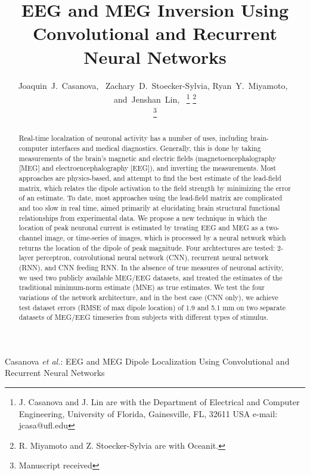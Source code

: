 \documentclass[journal]{IEEEtran}
\begin{document}

\title{EEG and MEG Inversion Using Convolutional and Recurrent Neural Networks}


\author{Joaquin~J.~Casanova,~
        Zachary~D.~Stoecker-Sylvia,
        Ryan~Y.~Miyamoto,~
        and~Jenshan~Lin,~%
\thanks{J. Casanova and J. Lin are with the Department
of Electrical and Computer Engineering, University of Florida, Gainesville,
FL, 32611 USA e-mail: jcasa@ufl.edu}%
\thanks{R. Miyamoto and Z. Stoecker-Sylvia are with Oceanit.}%

\thanks{Manuscript received }}

%
{Casanova \MakeLowercase{\textit{et al.}}: EEG and MEG Dipole Localization Using Convolutional and Recurrent Neural Networks}
\maketitle

\begin{abstract}

  Real-time localzation of neuronal activity has a number of uses, including brain-computer interfaces and medical diagnostics. Generally, this is done by taking measurements of the brain's magnetic and electric fields (magnetoencephalography [MEG] and electroencephalography [EEG]), and inverting the measurements. Most approaches are physics-based, and attempt to find the best estimate of the lead-field matrix, which relates the dipole activation to the field strength by minimizing the error of an estimate. To date, most approaches using the lead-field matrix are complicated and too slow in real time, aimed primarily at elucidating brain structural functional relationships from experimental data. We propose a new technique in which the location of peak neuronal current is estimated by treating EEG and MEG as a two-channel image, or time-series of images, which is processed by a neural network which returns the location of the dipole of peak magnitude. Four archtectures are tested: 2-layer perceptron, convolutional neural network (CNN), recurrent neural network (RNN), and CNN feeding RNN. In the absence of true measures of neuronal activity, we used two publicly available MEG/EEG datasets, and treated the estimates of the traditional minimum-norm estimate (MNE) as true estimates. We test the four variations of the network architecture, and in the best case (CNN only), we achieve test dataset errors (RMSE of max dipole location) of 1.9 and 5.1 mm on two separate datasets of MEG/EEG timeseries from subjects with different types of stimulus.
  
\end{abstract}
\end{document}
